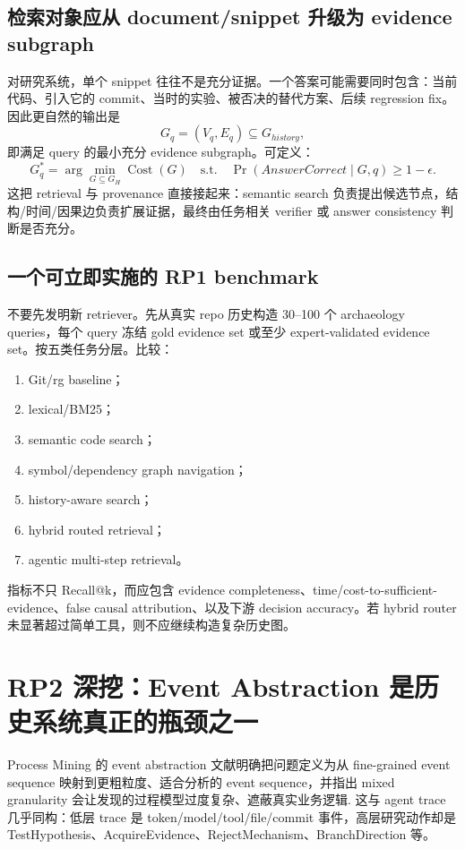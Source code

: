 \documentclass[11pt,a4paper]{ctexart}
\newcommand{\Cost}{\operatorname{Cost}}
\begin{document}
\subsection{检索对象应从 document/snippet 升级为 evidence subgraph}

对研究系统，单个 snippet 往往不是充分证据。一个答案可能需要同时包含：当前代码、引入它的 commit、当时的实验、被否决的替代方案、后续 regression fix。因此更自然的输出是
\begin{equation}
 G_q=(V_q,E_q)\subseteq G_{history},
\end{equation}
即满足 query 的最小充分 evidence subgraph。可定义：
\begin{equation}
G_q^*=\arg\min_{G\subseteq G_H}\Cost(G)
\quad\text{s.t.}\quad
\Pr(AnswerCorrect\mid G,q)\ge 1-\epsilon.
\end{equation}
这把 retrieval 与 provenance 直接接起来：semantic search 负责提出候选节点，结构/时间/因果边负责扩展证据，最终由任务相关 verifier 或 answer consistency 判断是否充分。

\subsection{一个可立即实施的 RP1 benchmark}

不要先发明新 retriever。先从真实 repo 历史构造 30--100 个 archaeology queries，每个 query 冻结 gold evidence set 或至少 expert-validated evidence set。按五类任务分层。比较：
\begin{enumerate}
\item Git/rg baseline；
\item lexical/BM25；
\item semantic code search；
\item symbol/dependency graph navigation；
\item history-aware search；
\item hybrid routed retrieval；
\item agentic multi-step retrieval。
\end{enumerate}
指标不只 Recall@k，而应包含 evidence completeness、time/cost-to-sufficient-evidence、false causal attribution、以及下游 decision accuracy。若 hybrid router 未显著超过简单工具，则不应继续构造复杂历史图。

\section{RP2 深挖：Event Abstraction 是历史系统真正的瓶颈之一}

Process Mining 的 event abstraction 文献明确把问题定义为从 fine-grained event sequence 映射到更粗粒度、适合分析的 event sequence，并指出 mixed granularity 会让发现的过程模型过度复杂、遮蔽真实业务逻辑\parencite{vanzelst2021abstraction,choi2024abstraction}. 这与 agent trace 几乎同构：低层 trace 是 token/model/tool/file/commit 事件，高层研究动作却是 TestHypothesis、AcquireEvidence、RejectMechanism、BranchDirection 等。
\end{document}
